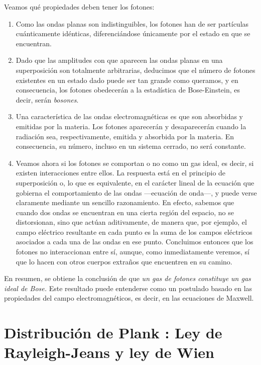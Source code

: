 Veamos qué propiedades deben tener los fotones:
\begin{enumerate}
	\item Como las ondas planas son indistinguibles, los fotones han de ser partículas cuánticamente idénticas, diferenciándose únicamente por el estado en que se encuentran.
	
	\item Dado que las amplitudes con que aparecen las ondas planas en una superposición son totalmente arbitrarias, deducimos que el número de fotones existentes en un estado dado puede ser tan grande como queramos, y en consecuencia, los fotones obedecerán a la estadística de Bose-Einstein, es decir, serán \emph{bosones}.
	
	\item Una característica de las ondas electromagnéticas es que son absorbidas y emitidas por la materia.
	Los fotones aparecerán y desaparecerán cuando la radiación sea, respectivamente, emitida y absorbida por la materia.
	En consecuencia, su número, incluso en un sistema cerrado, no será constante.
	
	\item Veamos ahora si los fotones se comportan o no como un gas ideal, es decir, si existen interacciones entre ellos.
	La respuesta está en el principio de superposición o, lo que es equivalente, en el carácter lineal de la ecuación que gobierna el comportamiento de las ondas ---ecuación de onda---, y puede verse claramente mediante un sencillo 	razonamiento. En efecto, sabemos que cuando dos ondas se encuentran en una cierta región del espacio, no se distorsionan, sino que actúan aditivamente, de manera que, por ejemplo, el campo eléctrico resultante en cada punto es la suma de los campos 	eléctricos asociados a cada una de las ondas en ese punto.
	Concluimos entonces que los fotones no interaccionan entre sí, aunque, como inmediatamente veremos, sí que lo hacen con otros cuerpos extraños que encuentren en su camino.
\end{enumerate}

En resumen, se obtiene la conclusión de que \emph{un gas de fotones constituye un gas ideal de Bose.}
Este resultado puede entenderse como un postulado basado en las propiedades del campo electromagnéticos, es decir, en las ecuaciones de Maxwell.

\section{Distribución de Plank : Ley de Rayleigh-Jeans y ley de Wien}